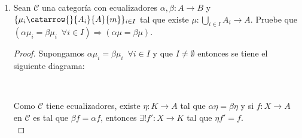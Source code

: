 \documentclass{article}
\begin{document}
\begin{enumerate}[label=\textbf{Ej \arabic*.}]
\begin{proof}
Sean $r\in R$, $a,b\in \displaystyle\sum_{i\in I}Im(\alpha_i)$ y supongamos que 
\begin{align*}
a&=\alpha_{h_0}(a_0)+\ldots+\alpha_{h_n}(a_n)\\
b&=\alpha_{k_0}(b_0)+\ldots+\alpha_{k_m}(b_m)\qquad n,m\in \mathbb{N}.
\end{align*}

Así 
\begin{gather*}
g(ra+b)=g\left(r\alpha_{h_0}(a_0)+\ldots+r\alpha_{h_n}(a_n)+r\alpha_{k_0}(b_0)+\ldots+r\alpha_{k_m}(b_m)\right)\\
=g\left(\alpha_{h_0}(ra_0)+\ldots+\alpha_{h_n}(ra_n)+\alpha_{k_0}(b_0)+\ldots+\alpha_{k_m}(b_m)\right)\\
=f'_{h_0}(ra_0)+\ldots+f'_{h_n}(ra_n)+f'_{k_0}(b_0)+\ldots+f'_{k_m}(b_m)\\
=\left(rf'_{h_0}(a_0)+\ldots+rf'_{h_n}(a_n)\right)+f'_{k_0}(b_0)+\ldots+f'_{k_m}(b_m)\\
=r\left(f'_{h_0}(a_0)+\ldots+f'_{h_n}(a_n)\right)+f'_{k_0}(b_0)+\ldots+f'_{k_m}(b_m)\\
=rg(a)+g(b).
\end{gather*}
Por lo tanto es morfismo.\\

Así $\forall x\in \displaystyle\sum_{i\in I}Im(\alpha_i)$ se tiene que 
\begin{gather*}
\mu g(x)=\mu \left(\sum_{k=0}^nf'_{i_k}(x_k)\right)
=\sum_{k=0}^n\mu f'_{i_k}(x_k)\\
=\sum_{k=0}^n f\alpha_{i_k}(x_k)
=f\left(\sum_{k=0}^n\alpha_{i_k}(x_k)\right)\\
=f\nu(x).
\end{gather*}
Por lo tanto $\displaystyle\sum_{i\in I}Im(\alpha_i)$ es la unión categorica.

\end{proof}

\item Sean $\mathscr{C}$ una categoría con ecualizadores $\alpha,\beta\colon A\to B$ y \\ $\{\mu_i\catarrow{}{A_i}{A}{m}\}_{i\in I}$ tal que 
existe $\mu:\displaystyle\bigcup_{i\in I}A_i\longrightarrow A.$ Pruebe que \\ $\left(\alpha\mu_i=\beta\mu_i\,\,\,\forall i\in I\right)\Rightarrow
\left(\alpha\mu=\beta\mu\right).$
\begin{proof}

Supongamos $\alpha\mu_i=\beta\mu_i\,\,\,\forall i\in I$ y que $I\neq \emptyset$ entonces se tiene el siguiente diagrama:
\\
\centerline{
\,
}
Como $\mathscr{C}$ tiene ecualizadores, existe $\eta:K\to A$ tal que $\alpha\eta=\beta\eta$ y si $f:X\to A$ en $\mathscr{C}$ es tal que
 $\beta f=\alpha f$, entonces $\exists ! f':X\to K$ tal que $\eta f'=f$. \\


\end{proof}
\end{enumerate}
\end{document}
